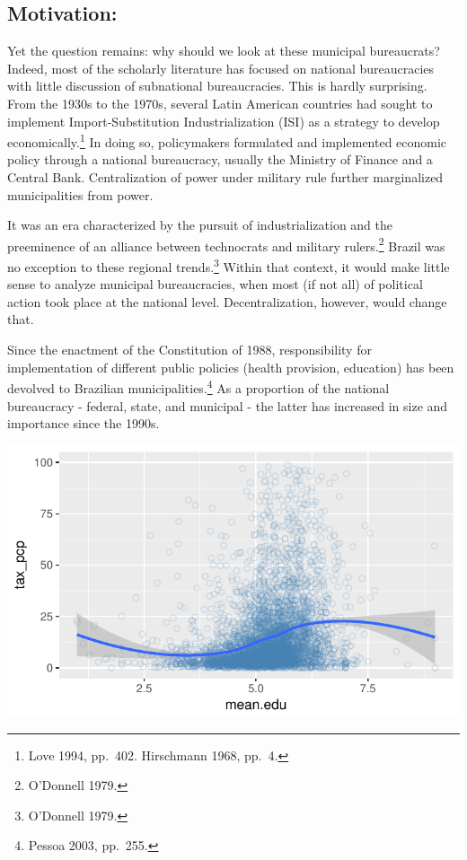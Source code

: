 \documentclass[]{elsarticle} %
\makeatletter
\def\maxwidth{\ifdim\Gin@nat@width>\linewidth\linewidth
\else\Gin@nat@width\fi}
\let\Oldincludegraphics\includegraphics
\renewcommand{\includegraphics}[1]{\Oldincludegraphics[width=\maxwidth]{#1}}
\makeatother
\begin{document}
\subsection{Motivation:}\label{motivation}

Yet the question remains: why should we look at these municipal
bureaucrats? Indeed, most of the scholarly literature has focused on
national bureaucracies with little discussion of subnational
bureaucracies. This is hardly surprising. From the 1930s to the 1970s,
several Latin American countries had sought to implement
Import-Substitution Industrialization (ISI) as a strategy to develop
economically.\footnote{Love 1994, pp.~402. Hirschmann 1968, pp.~4.} In
doing so, policymakers formulated and implemented economic policy
through a national bureaucracy, usually the Ministry of Finance and a
Central Bank. Centralization of power under military rule further
marginalized municipalities from power.

It was an era characterized by the pursuit of industrialization and the
preeminence of an alliance between technocrats and military
rulers.\footnote{O'Donnell 1979.} Brazil was no exception to these
regional trends.\footnote{O'Donnell 1979.} Within that context, it would
make little sense to analyze municipal bureaucracies, when most (if not
all) of political action took place at the national level.
Decentralization, however, would change that.

Since the enactment of the Constitution of 1988, responsibility for
implementation of different public policies (health provision,
education) has been devolved to Brazilian municipalities.\footnote{Pessoa
  2003, pp.~255.} As a proportion of the national bureaucracy - federal,
state, and municipal - the latter has increased in size and importance
since the 1990s.

\includegraphics{First_Draft_files/figure-latex/unnamed-chunk-3-1.pdf}
\end{document}
